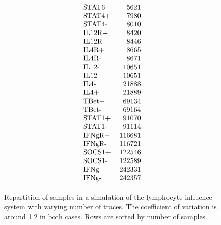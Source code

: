 \documentclass{llncs}
\begin{document}
\begin{figure}[htbp]
{$$\begin{tabular}{lr}
STAT6-   &    5621 \\
STAT4+   &    7980 \\
STAT4-   &    8010 \\
IL12R+   &    8420 \\
IL12R-   &    8446 \\
IL4R+    &    8665 \\
IL4R-    &    8671 \\
IL12-    &   10651 \\
IL12+    &   10651 \\
IL4-     &   21888 \\
IL4+     &   21889 \\
TBet+    &   69134 \\
TBet-    &   69164 \\
STAT1+   &   91070 \\
STAT1-   &   91114 \\
IFNgR+   &  116681 \\
IFNgR-   &  116721 \\
SOCS1+   &  122546 \\
SOCS1-   &  122589 \\
IFNg+    &  242331 \\
IFNg-    &  242357 \\
\bottomrule
\end{tabular}
	$$\hspace{1ex}
}
\caption{Repartition of samples in a simulation of the lymphocyte influence system with varying number of traces. The coefficient of variation is around 1.2 in both cases. Rows are sorted by number of samples.}
\end{figure}

\begin{listfig}[htb]
	
	\caption{Results of PAC learning on 140 simulation of the lymphocyte influence system, with random starting points.\label{lympho-rand.res}}
\end{listfig}
\end{document}
